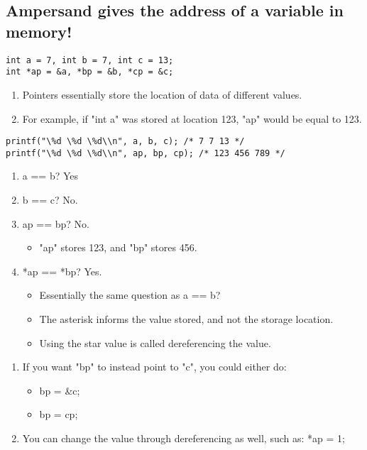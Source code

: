 \documentclass[12pt]{article}
\theoremstyle{definition}
\begin{document}
\subsection{Ampersand gives the address of a variable in memory!}
\begin{lstlisting}
int a = 7, int b = 7, int c = 13;
int *ap = &a, *bp = &b, *cp = &c;
\end{lstlisting}
\begin{enumerate}
    \item Pointers essentially store the location of data of different values.
    \item For example, if "int a" was stored at location 123, "ap" would be equal to 123. 
\end{enumerate}
\begin{lstlisting}
printf("\%d \%d \%d\\n", a, b, c); /* 7 7 13 */
printf("\%d \%d \%d\\n", ap, bp, cp); /* 123 456 789 */
\end{lstlisting}
\begin{enumerate}
    \item a == b? Yes
    \item b == c? No.
    \item ap == bp? No. 
        \begin{itemize}
            \item "ap" stores 123, and "bp" stores 456. 
        \end{itemize}
    \item *ap == *bp? Yes.
        \begin{itemize}
            \item Essentially the same question as a == b? 
            \item The asterisk informs the value stored, and not the storage location. 
            \item Using the star value is called dereferencing the value. 
        \end{itemize}
        
\end{enumerate}
\begin{enumerate}
    \item If you want "bp" to instead point to "c", you could either do:
        \begin{itemize}
            \item bp = \&c;
            \item bp = cp;
        \end{itemize}
    \item You can change the value through dereferencing as well, such as: 
    *ap = 1;  
        
\end{enumerate}
\end{document}
